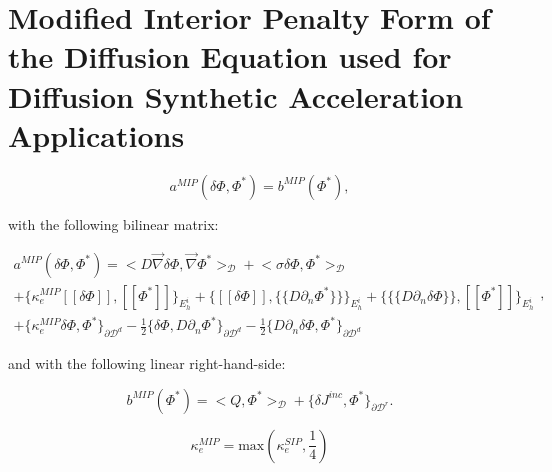 \section{Modified Interior Penalty Form of the Diffusion Equation used for Diffusion Synthetic Acceleration Applications}
\label{sec::DSA_MIP}

\begin{equation}
a^{MIP}( \delta \Phi, \Phi^*) = b^{MIP}(\Phi^*),
\label{eq::MIP_weak_form}
\end{equation}

\noindent with the following bilinear matrix:

\begin{equation}
\label{eq::MIP_bilinear_form}
\begin{aligned}
a^{MIP}(\delta \Phi, \Phi^*)  = \Big<  D \vec{\nabla} \delta  \Phi , \vec{\nabla} \Phi^*  \Big>_{\mathcal{D}} + \Big<  \sigma \delta  \Phi ,  \Phi^*  \Big>_{\mathcal{D}}    \\
+  \Big\{ \kappa_e^{MIP} [\![ \delta  \Phi ]\!] , [\![  \Phi^* ]\!]\Big\}_{E_h^i} + \Big\{  [\![  \delta \Phi ]\!] , \{\!\{  D \partial_n \Phi^* \}\!\}\Big\}_{E_h^i}  + \Big\{ \{\!\{  D \partial_n \delta \Phi \}\!\} , [\![ \Phi^* ]\!]\Big\}_{E_h^i} \\
+ \Big\{ \kappa_e^{MIP}  \delta \Phi ,   \Phi^* \Big\}_{\partial \mathcal{D}^d} - \frac{1}{2} \Big\{  \delta \Phi  ,  D \partial_n \Phi^* \Big\}_{\partial \mathcal{D}^d} - \frac{1}{2} \Big\{   D \partial_n \delta  \Phi , \Phi^* \Big\}_{\partial \mathcal{D}^d}  
\end{aligned} ,
\end{equation}

\noindent and with the following linear right-hand-side:

\begin{equation}
\label{eq::MIP_linear_form}
b^{MIP} (\Phi^*) = \Big<  Q, \Phi^*  \Big>_{\mathcal{D}}  + \Big\{ \delta  J^{inc}, \Phi^*  \Big\}_{\partial \mathcal{D}^r} .
\end{equation}


\begin{equation}
\label{eq::MIP_penalty_term}
\kappa_e^{MIP} = \text{max} \left( \kappa_e^{SIP}, \frac{1}{4} \right)
\end{equation}

